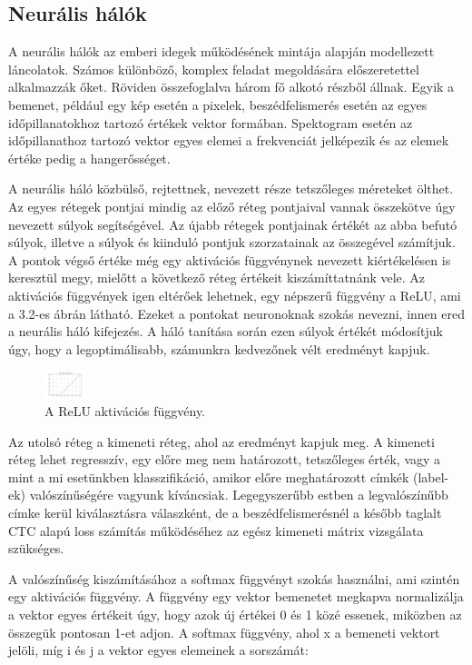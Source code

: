 \subsection{Neurális hálók}

A neurális hálók az emberi idegek működésének mintája alapján modellezett láncolatok. Számos különböző, komplex feladat megoldására előszeretettel alkalmazzák őket. Röviden összefoglalva három fő alkotó részből állnak. Egyik a bemenet, például egy kép esetén a pixelek, beszédfelismerés esetén az egyes időpillanatokhoz tartozó értékek vektor formában. Spektogram esetén az időpillanathoz tartozó vektor egyes elemei a frekvenciát jelképezik és az elemek értéke pedig a hangerősséget.

A neurális háló közbülső, rejtettnek, nevezett része tetszőleges méreteket ölthet. Az egyes rétegek pontjai mindig az előző réteg pontjaival vannak összekötve úgy nevezett súlyok segítségével. Az újabb rétegek pontjainak értékét az abba befutó súlyok, illetve a súlyok és kiinduló pontjuk szorzatainak az összegével számítjuk. A pontok végső értéke még egy aktivációs függvénynek nevezett kiértékelésen is keresztül megy, mielőtt a következő réteg értékeit kiszámíttatnánk vele. Az aktivációs függvények igen eltérőek lehetnek, egy népszerű függvény a ReLU, ami a 3.2-es ábrán látható. Ezeket a pontokat neuronoknak szokás nevezni, innen ered a neurális háló kifejezés. A háló tanítása során ezen súlyok értékét módosítjuk úgy, hogy a legoptimálisabb, számunkra kedvezőnek vélt eredményt kapjuk.

\begin{figure}[!ht]
\centering
\includegraphics[width=12mm, keepaspectratio]{figures/ReLU.png}
\caption{A ReLU aktivációs függvény.}
\end{figure}

Az utolsó réteg a kimeneti réteg, ahol az eredményt kapjuk meg. A kimeneti réteg lehet regresszív, egy előre meg nem határozott, tetszőleges érték, vagy a mint a mi esetünkben klasszifikáció, amikor előre meghatározott címkék (label-ek) valószínűségére vagyunk kíváncsiak. Legegyszerűbb estben a legvalószínűbb címke kerül kiválasztásra válaszként, de a beszédfelismerésnél a később taglalt CTC alapú loss számítás működéséhez az egész kimeneti mátrix vizsgálata szükséges.

A valószínűség kiszámításához a softmax \cite{softmax} függvényt szokás használni, ami szintén egy aktivációs függvény. A függvény egy vektor bemenetet megkapva normalizálja a vektor egyes értékeit úgy, hogy azok új értékei 0 és 1 közé essenek, miközben az összegük pontosan 1-et adjon. A softmax függvény, ahol x a bemeneti vektort jelöli, míg i és j a vektor egyes elemeinek a sorszámát:

